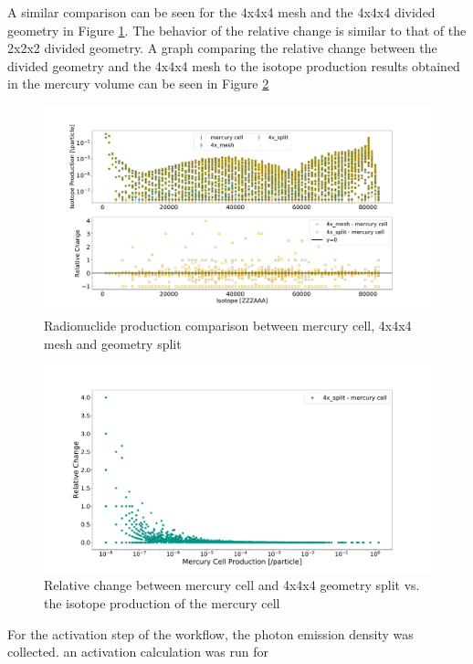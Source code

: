 A similar comparison can be seen for the 4x4x4 mesh and the 4x4x4 divided geometry
in Figure \ref{fig:1prod_cell_4x}. The behavior of the relative change is similar
to that of the 2x2x2 divided geometry. A graph comparing the relative change between
the divided geometry and the 4x4x4 mesh  to the isotope production results obtained
in the mercury volume can be seen in Figure \ref{fig:1prod_cell_4x_rc}
%
\begin{figure}[H]
	\centering
	\includegraphics[scale=0.42,trim={2cm 1cm 3cm 2cm},clip]{../figs/toy_p1/prod_VPI_4x.pdf}
	\caption{Radionuclide production comparison between mercury cell, 4x4x4 mesh and geometry split}
	\label{fig:1prod_cell_4x}
\end{figure}
%
\begin{figure}[H]
 \centering
 \includegraphics[scale=0.4,trim={3cm 0.5cm 3cm 3cm},clip]{../figs/toy_p1/prod_VPI_rc_4x_split.pdf}
 \caption{Relative change between mercury cell and 4x4x4 geometry split vs. the isotope production of the mercury cell}
 \label{fig:1prod_cell_4x_rc}
\end{figure}
%
For the activation step of the workflow, the photon emission density was collected.
an activation calculation was run for
